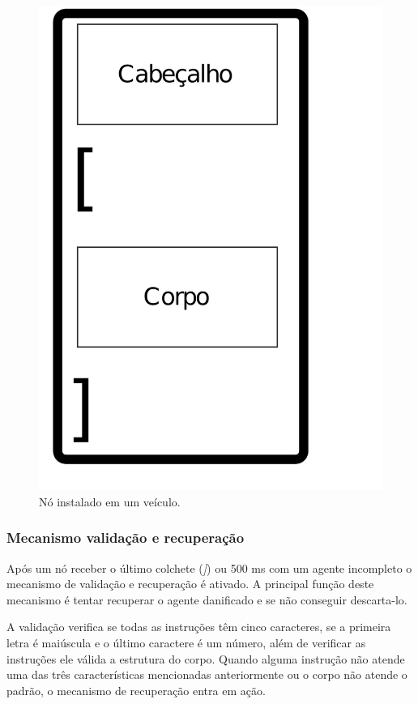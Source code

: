 \begin{figure}[htbp]
	\centering
	\includegraphics[scale=0.25]{metodologia/figuras/estruturaAgente.pdf}
	\caption{Nó instalado em um veículo.}
	\label{fig:estruturaAgente}
\end{figure}

\subsubsection{Mecanismo validação e recuperação}

Após um nó receber o último colchete (\emph{]}) ou 500 ms com um agente incompleto o mecanismo de validação e recuperação é ativado. A principal função deste mecanismo é tentar recuperar o agente danificado e se não conseguir descarta-lo. 

A validação verifica se todas as instruções têm cinco caracteres, se a primeira letra é maiúscula e o último caractere é um número, além de verificar as instruções ele válida a estrutura do corpo. Quando alguma instrução não atende uma das três características mencionadas anteriormente ou o corpo não atende o padrão, o mecanismo de recuperação entra em ação. 

